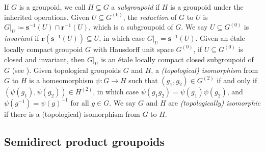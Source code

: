 \documentclass[11pt]{amsart}
\theoremstyle{definition}
\numberwithin{thm}{section}
\numberwithin{equation}{section}
\newcommand{\Define}[1]{\emph{#1}}
\newcommand{\range}{\mathbf{r}}
\newcommand{\source}{\mathbf{s}}
\newcommand{\reduction}[2]{#1|_{#2}}
\newcommand{\composablepairs}[1]{#1^{(2)}}
\newcommand{\unitspace}[1]{#1^{(0)}}
\begin{document}
If $G$ is a groupoid, we call $H \subseteq G$ a \Define{subgroupoid} if $H$ is a groupoid under the inherited operations.
Given $U \subseteq \unitspace{G}$, the \Define{reduction} of $G$ to $U$ is $\reduction{G}{U} \coloneqq \source^{-1}(U) \cap \range^{-1}(U)$, which is a subgroupoid of $G$.
We say $U \subseteq \unitspace{G}$ is \Define{invariant} if $\range(\source^{-1}(U)) \subseteq U$, in which case $\reduction{G}{U} = \source^{-1}(U)$.
Given an \'etale locally compact groupoid $G$ with Hausdorff unit space $\unitspace{G}$, if $U \subseteq \unitspace{G}$ is closed and invariant, then $\reduction{G}{U}$ is an \'etale locally compact closed subgroupoid of $G$ (see \cite[Page 96]{SSW20}).
Given topological groupoids $G$ and $H$, a \Define{(topological) isomorphism} from $G$ to $H$ is a homeomorphism $\psi \colon G \to H$ such that $(g_1, g_2) \in \composablepairs{G}$ if and only if $(\psi(g_1), \psi(g_2)) \in \composablepairs{H}$, in which case $\psi(g_1g_2) = \psi(g_1)\psi(g_2)$, and $\psi(g^{-1}) = \psi(g)^{-1}$ for all $g \in G$. 
We say $G$ and $H$ are \Define{(topologically) isomorphic} if there is a (topological) isomorphism from $G$ to $H$.

\subsection{Semidirect product groupoids}
\label{sec:semidirect_product_groupoid_prelims}
\end{document}
